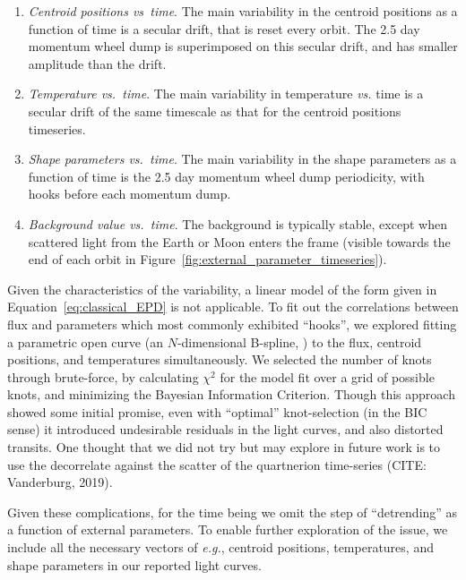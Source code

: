 \documentclass[12pt,twocolumn,tighten]{aastex62}
\begin{document}
\begin{enumerate}

\item {\it Centroid positions vs\ time}.  The main variability in the
  centroid positions as a function of time is a secular drift, that is
    reset every orbit.  The 2.5 day momentum wheel dump is
    superimposed on this secular drift, and has smaller amplitude than
    the drift.

\item {\it Temperature vs.\ time}.  The main variability in temperature
  {\it vs.} time is a secular drift of the same timescale as that for
    the centroid positions timeseries.

\item {\it Shape parameters vs.\ time}.  The main variability in the
  shape parameters as a function of time is the 2.5 day momentum wheel
    dump periodicity, with hooks before each momentum dump.

\item {\it Background value vs.\ time}.  The background is typically stable, 
except when scattered light from the Earth or Moon enters the frame (visible 
towards the end of each orbit in 
Figure~\ref{fig:external_parameter_timeseries}).

\end{enumerate}

Given the characteristics of the variability, a linear model of the
form given in Equation~\ref{eq:classical_EPD} is not applicable.  To
fit out the correlations between flux and parameters which most
commonly exhibited ``hooks'', we explored fitting a parametric open
curve (an $N$-dimensional B-spline, \citealt{dierckx_curve_1996}) to
the flux, centroid positions, and temperatures simultaneously.  We
selected the number of knots through brute-force, by calculating
$\chi^2$ for the model fit over a grid of possible knots, and
minimizing the Bayesian Information Criterion.  Though this approach
showed some initial promise, even with ``optimal'' knot-selection (in
the BIC sense) it introduced undesirable residuals in the light curves,
and also distorted transits.
One thought that we did not try but may explore in future work
is to use the decorrelate against the scatter of the quartnerion 
time-series (CITE: Vanderburg, 2019).

Given these complications, for the time being we omit the step of
``detrending'' as a function of external parameters. To
enable further exploration of the issue, we include all the necessary
vectors of {\it e.g.}, centroid positions, temperatures, and shape
parameters in our reported light curves.
	
\end{document}
